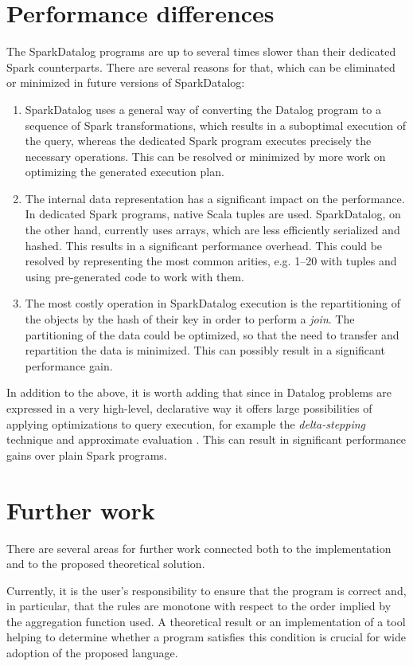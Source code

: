 \section{Performance differences}\label{s:whyslow}
The SparkDatalog programs are up to several times slower than their dedicated Spark counterparts. There are several reasons for that, which can be eliminated or minimized in future versions of SparkDatalog:
\begin{enumerate}
\item SparkDatalog uses a general way of converting the Datalog program to a sequence of Spark transformations, which results in a suboptimal execution of the query, whereas the dedicated Spark program executes precisely the necessary operations. This can be resolved or minimized by more work on optimizing the generated execution plan.
\item The internal data representation has a significant impact on the performance. In dedicated Spark programs, native Scala tuples are used. SparkDatalog, on the other hand, currently uses arrays, which are less efficiently serialized and hashed. This results in a significant performance overhead. This could be resolved by representing the most common arities, e.g. 1--20 with tuples and using pre-generated code to work with them.
\item The most costly operation in SparkDatalog execution is the repartitioning of the objects by the hash of their key in order to perform a \emph{join}. The partitioning of the data could be optimized, so that the need to transfer and repartition the data is minimized. This can possibly result in a significant performance gain.
\end{enumerate}

In addition to the above, it is worth adding that since in Datalog problems are expressed in a very high-level, declarative way it offers large possibilities of applying optimizations to query execution, for example the \emph{delta-stepping} technique and approximate evaluation \cite{distsoc}. This can result in significant performance gains over plain Spark programs.

\section{Further work}

There are several areas for further work connected both to the implementation and to the proposed theoretical solution.

Currently, it is the user's responsibility to ensure that the program is correct and, in particular, that the rules are monotone with respect to the order implied by the aggregation function used. A theoretical result or an implementation of a tool helping to determine whether a program satisfies this condition is crucial for wide adoption of the proposed language.

